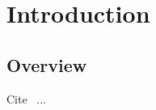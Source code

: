 \chapter{Introduction}
\label{sec:ch_intro}

\section{Overview}
\label{sec:intro_overview}

Cite~\citep{zabardast2020refactoring} ...

